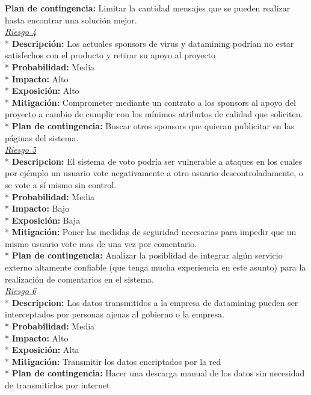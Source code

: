 {\bf{Plan de contingencia:}} Limitar la cantidad mensajes que se pueden realizar hasta encontrar una solución mejor.\\
\newline
\uline{\it{Riesgo 4}}\\*
{\bf{Descripción:}} Los actuales sponsors de virus y datamining podrían no estar satisfechos con el producto y retirar su apoyo al proyecto\\*
{\bf{Probabilidad:}} Media\\*
{\bf{Impacto:}} Alto\\*
{\bf{Exposición:}} Alto\\*
{\bf{Mitigación:}} Comprometer mediante un contrato a los sponsors al apoyo del proyecto a cambio de cumplir con los mínimos atributos de calidad que soliciten.\\*
{\bf{Plan de contingencia:}} Buscar otros sponsors que quieran publicitar en las páginas del sistema.\\
\newline
\uline{\it{Riesgo 5}}\\*
{\bf{Descripcion:}} El sistema de voto podría ser vulnerable a ataques en los cuales por ejémplo un usuario vote negativamente a otro usuario descontroladamente, o se vote a sí mismo sin control.\\*
{\bf{Probabilidad:}} Media\\*
{\bf{Impacto:}} Bajo\\*
{\bf{Exposición:}} Baja\\*
{\bf{Mitigación:}} Poner las medidas de seguridad necesarias para impedir que un mismo usuario vote mas de una vez por comentario.\\*
{\bf{Plan de contingencia:}} Analizar la posiblidad de integrar algún servicio externo altamente confiable (que tenga mucha experiencia en este asunto) para la realización de comentarios en el sistema.\\
\newline
\uline{\it{Riesgo 6}}\\*
{\bf{Descripcion:}} Los datos transmitidos a la empresa de datamining pueden ser interceptados por personas ajenas al gobierno o la empresa.\\*
{\bf{Probabilidad:}} Media\\*
{\bf{Impacto:}} Alto\\*
{\bf{Exposición:}} Alta\\*
{\bf{Mitigación:}} Transmitir los datos encriptados por la red\\*
{\bf{Plan de contingencia:}} Hacer una descarga manual de los datos sin necesidad de transmitirlos por internet.\\
